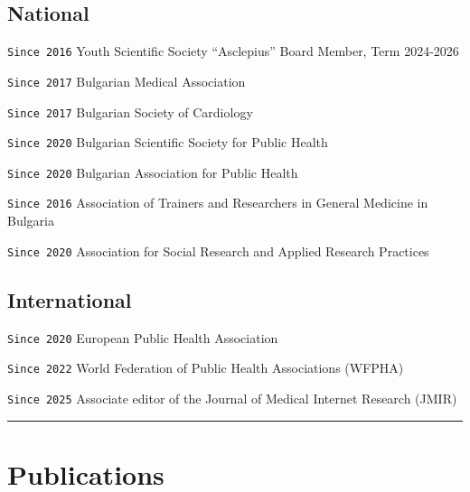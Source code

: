\documentclass[
  12pt,
  letterpaper,
  DIV=11,
  numbers=noendperiod]{scrartcl}
\begin{document}
\subsection{National}\label{national}

\texttt{Since\ 2016} Youth Scientific Society ``Asclepius'' \textbar{}
Board Member, Term 2024-2026

\texttt{Since\ 2017} Bulgarian Medical Association

\texttt{Since\ 2017} Bulgarian Society of Cardiology

\texttt{Since\ 2020} Bulgarian Scientific Society for Public Health

\texttt{Since\ 2020} Bulgarian Association for Public Health

\texttt{Since\ 2016} Association of Trainers and Researchers in General
Medicine in Bulgaria

\texttt{Since\ 2020} Association for Social Research and Applied
Research Practices

\subsection{International}\label{international}

\texttt{Since\ 2020} European Public Health Association

\texttt{Since\ 2022} World Federation of Public Health Associations
(WFPHA)

\texttt{Since\ 2025} Associate editor of the Journal of Medical Internet
Research (JMIR)

\begin{center}\rule{0.5\linewidth}{0.5pt}\end{center}

\section{Publications}\label{publications}
\end{document}
